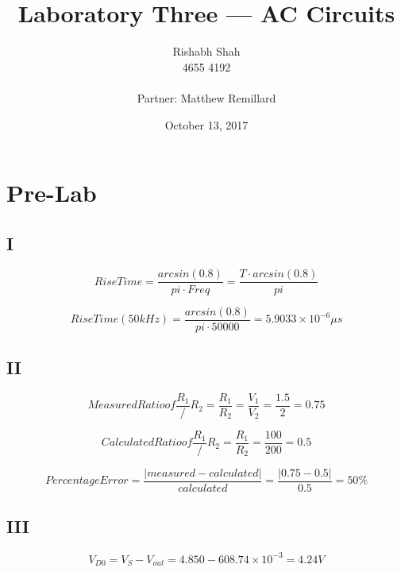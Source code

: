 \documentclass[10pt]{article}
\begin{document}
\title{Laboratory Three --- AC Circuits}
\date{October 13, 2017}
\author{Rishabh Shah\\ 4655 4192\\ \\ Partner: Matthew Remillard}
\maketitle
\newpage

\section*{Pre-Lab}
\subsection*{I}
\noindent$$RiseTime = \frac{arcsin(0.8)}{pi \cdot Freq} = \frac{T \cdot arcsin(0.8)}{pi}$$

\noindent$$RiseTime(50 kHz) = \frac{arcsin(0.8)}{pi \cdot 50000} = 5.9033 \times 10^{-6}\mu s$$

\subsection*{II}
\noindent$$Measured Ratio of \frac{R_1}/{R_2} = \frac{R_1}{R_2} = \frac{V_1}{V_2} = \frac{1.5}{2} = 0.75$$

\noindent$$Calculated Ratio of \frac{R_1}/{R_2} = \frac{R_1}{R_2} = \frac{100}{200} = 0.5$$

\noindent$$Percentage Error = \frac{|measured-calculated|}{calculated} = \frac{|0.75-0.5|}{0.5} = 50\%$$

\subsection*{III}
\noindent$$V_{D0} = V_S - V_{out} = 4.850 - 608.74 \times 10^{-3} = 4.24V$$
\end{document}

